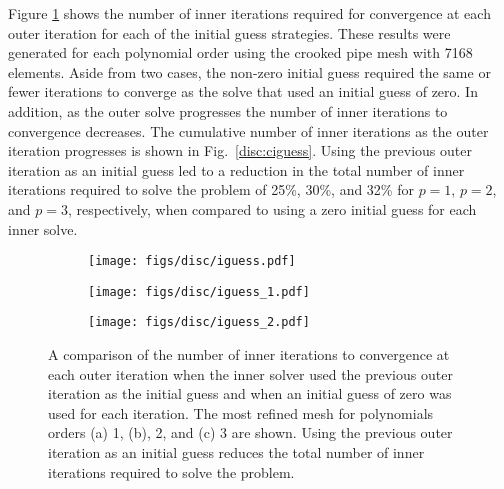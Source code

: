 \documentclass[../doc.tex]{subfiles}
\begin{document}
Figure \ref{disc:iguess} shows the number of inner iterations required for convergence at each outer iteration for each of the initial guess strategies. These results were generated for each polynomial order using the crooked pipe mesh with 7168 elements. Aside from two cases, the non-zero initial guess required the same or fewer iterations to converge as the solve that used an initial guess of zero. In addition, as the outer solve progresses the number of inner iterations to convergence decreases. The cumulative number of inner iterations as the outer iteration progresses is shown in Fig.~\ref{disc:ciguess}. Using the previous outer iteration as an initial guess led to a reduction in the total number of inner iterations required to solve the problem of 25\%, 30\%, and 32\%  for $p=1$, $p=2$, and $p=3$, respectively, when compared to using a zero initial guess for each inner solve. 
\begin{figure}
\centering 
\begin{subfigure}{.32\textwidth}
	\centering
	\texttt{[image: figs/disc/iguess.pdf]}
	\caption{}
\end{subfigure}
\begin{subfigure}{.32\textwidth}
	\centering
	\texttt{[image: figs/disc/iguess\_1.pdf]}
	\caption{}
\end{subfigure}
\begin{subfigure}{.32\textwidth}
	\centering
	\texttt{[image: figs/disc/iguess\_2.pdf]}
	\caption{}
\end{subfigure}
\caption{A comparison of the number of inner iterations to convergence at each outer iteration when the inner solver used the previous outer iteration as the initial guess and when an initial guess of zero was used for each iteration. The most refined mesh for polynomials orders (a) 1, (b), 2, and (c) 3 are shown. Using the previous outer iteration as an initial guess reduces the total number of inner iterations required to solve the problem.}
\label{disc:iguess}
\end{figure}
\end{document}
